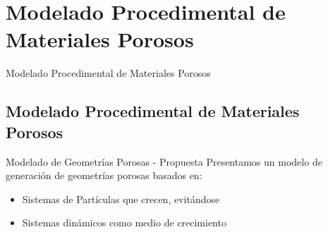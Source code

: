 \documentclass[spanish,unknownkeysallowed]{beamer}
\begin{document}
\section[Mod. de Materiales Porosos]{Modelado Procedimental de Materiales Porosos}

\begin{frame}
\begin{block}{}
\begin{center}
\vspace{1cm}
\huge{Modelado Procedimental de Materiales Porosos}
\vspace{1cm}
\end{center}
\end{block}
\end{frame}

\subsection{Modelado Procedimental de Materiales Porosos}
\begin{frame}{Modelado de Geometrías Porosas - Propuesta}
Presentamos un modelo de generación de geometrías porosas basados en:
\begin{itemize}
\item Sistemas de Partículas que crecen, evitándose
\item Sistemas dinámicos como medio de crecimiento
\end{itemize}
\end{frame}
\end{document}
